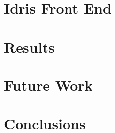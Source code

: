 \documentclass[runningheads]{llncs}
\begin{document}
	\section{Idris Front End} \label{sec:idris-front-end}
	
	
	\section{Results}
	
	
	\section{Future Work} \label{sec:future-work}
	
	
	\section{Conclusions}
	
		
	\newpage
	

	
\end{document}
